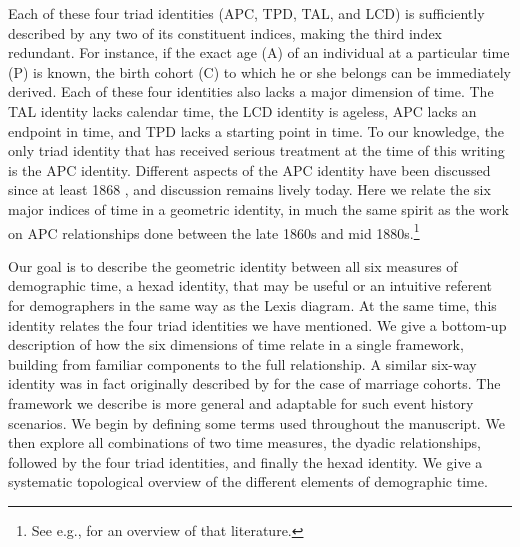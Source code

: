 \documentclass[12pt,oneside,a4paper]{article} %
\begin{document}
Each of these four triad identities (APC, TPD, TAL, and LCD) is sufficiently
described by any two of its constituent indices, making the third index
redundant. For instance, if the exact age (A) of an individual at a particular
time (P) is known, the birth cohort (C) to which he or she belongs can be immediately derived. Each of these four identities also lacks a major dimension of time. The TAL identity lacks calendar time, the LCD identity is ageless, APC lacks an endpoint in time, and TPD lacks a starting point in time.
To our knowledge, the only triad identity that has received serious
treatment at the time of this writing is the APC identity. Different
aspects of the APC identity have been discussed since at least 1868
\citep{knapp1868ermittlung}, and discussion remains lively today. Here we relate the six major indices of time in a geometric identity, in much the same spirit as the work on APC relationships done between the late
1860s and mid 1880s.\footnote{See e.g., \citet{keiding2011age} for an overview of that literature.} 

Our goal is to describe the geometric identity between all
six measures of demographic time, a hexad identity, that may be useful or an intuitive
referent for demographers in the same way as the Lexis diagram. At the same time, this identity relates the
four triad identities we have mentioned. We give a bottom-up
description of how the six dimensions of time relate in a single framework,
building from familiar components to the full relationship. A similar
six-way identity was in fact originally described by \citet{lexis1875einleitung}
for the case of marriage cohorts. The framework we describe is more general and
adaptable for such event history scenarios.
We begin by defining some terms used throughout the manuscript.
We then explore all combinations of two time measures, the dyadic relationships, followed by the four triad identities, and
finally the hexad identity. We give a systematic topological overview of the
different elements of demographic time. 
\end{document}

